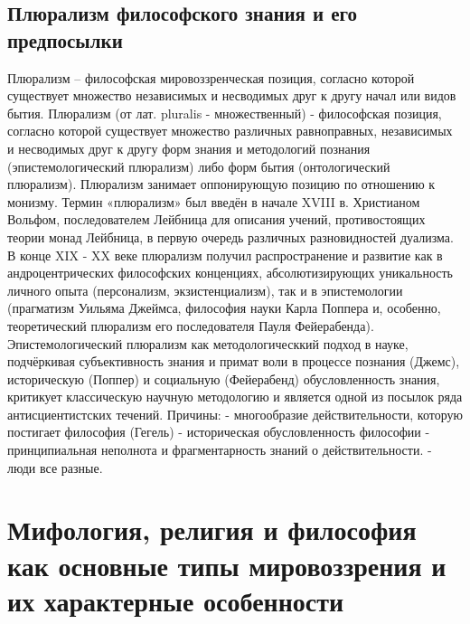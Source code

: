 \documentclass[12pt]{article}
\begin{document}
\subsection{Плюрализм философского знания и его предпосылки}
Плюрализм – философская мировоззренческая позиция, согласно которой существует множество независимых
и несводимых друг к другу начал или видов бытия. 
Плюрализм (от лат. pluralis - множественный) - философская позиция, согласно которой существует множество
различных равноправных,  независимых и несводимых друг к другу форм знания и методологий познания
(эпистемологический  плюрализм)  либо  форм  бытия  (онтологический  плюрализм).  Плюрализм  занимает
оппонирующую позицию по отношению к монизму. 
Термин  «плюрализм»  был  введён  в  начале  XVIII  в.  Христианом  Вольфом,  последователем  Лейбница  для
описания  учений,  противостоящих  теории  монад  Лейбница,  в  первую  очередь  различных  разновидностей
дуализма.
В конце XIX - XX веке плюрализм получил распространение и развитие как в андроцентрических философских
конценциях,  абсолютизирующих  уникальность  личного  опыта  (персонализм,  экзистенциализм),  так  и  в
эпистемологии (прагматизм Уильяма Джеймса, философия науки Карла Поппера и, особенно, теоретический
плюрализм его последователя Пауля Фейерабенда).
Эпистемологический плюрализм как методологическкий подход в науке, подчёркивая субъективность знания и
примат  воли  в  процессе  познания  (Джемс),  историческую  (Поппер)  и  социальную  (Фейерабенд)
обусловленность знания, критикует классическую научную методологию и является одной из посылок ряда
антисциентистских течений.
Причины:
- многообразие действительности, которую постигает философия (Гегель)
- историческая обусловленность философии
- принципиальная неполнота и фрагментарность знаний о действительности.
- люди все разные.


\newpage
\section{Мифология, религия и философия как основные типы мировоззрения и их характерные особенности}
\end{document}
